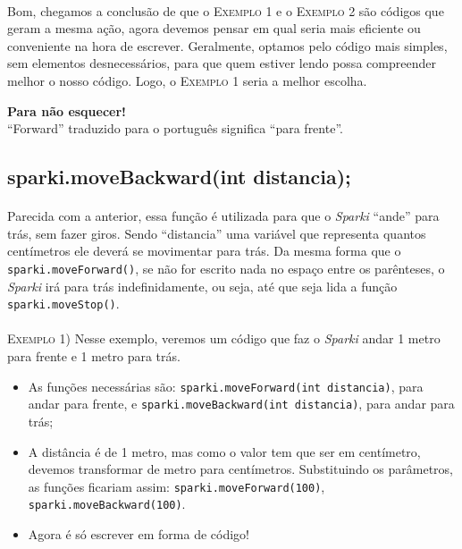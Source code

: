     \paragraph{}
    Bom, chegamos a conclusão de que o \textsc{Exemplo 1} e o \textsc{Exemplo 2} são códigos que geram a mesma ação, agora devemos pensar em qual seria mais eficiente ou conveniente na hora de escrever. Geralmente, optamos pelo código mais simples, sem elementos desnecessários, para que quem estiver lendo possa compreender melhor o nosso código. Logo, o \textsc{Exemplo 1} seria a melhor escolha.
    
    \begin{center}
    \textcolor{mydarkblue}{\textbf{Para não esquecer!}} \\``Forward'' traduzido para o português significa ``para frente''. 
    \end{center}

\subsection{sparki.moveBackward(int distancia);}
    \paragraph{}
    Parecida com a anterior, essa função é utilizada para que o \textsl{Sparki} ``ande'' para trás, sem fazer giros. Sendo ``distancia'' uma variável que representa quantos centímetros ele deverá se movimentar para trás. Da mesma forma que o \lstinline[columns=fixed]{sparki.moveForward()}, se não for escrito nada no espaço entre os parênteses, o \textsl{Sparki} irá para trás indefinidamente, ou seja, até que seja lida a função \lstinline[columns=fixed]{sparki.moveStop()}.
    \\~\\
    
    \textsc{Exemplo 1)} Nesse exemplo, veremos um código que faz o \textsl{Sparki} andar 1 metro para frente e 1 metro para trás.
    
    \begin{itemize}
        \item As funções necessárias são: \lstinline[columns=fixed]{sparki.moveForward(int distancia)}, para andar para frente, e \lstinline[columns=fixed]{sparki.moveBackward(int distancia)}, para andar para trás;
        \item A distância é de 1 metro, mas como o valor tem que ser em centímetro, devemos transformar de metro para centímetros. Substituindo os parâmetros, as funções ficariam assim: \lstinline[columns=fixed]{sparki.moveForward(100)}, \lstinline[columns=fixed]{sparki.moveBackward(100)}.
        \item Agora é só escrever em forma de código!
    \end{itemize}
    
